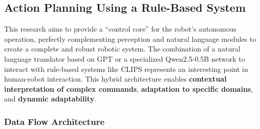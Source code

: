 \subsection{Action Planning Using a Rule-Based System}
\label{sub:clips}

 This research aims to provide a \enquote{control core} for the robot's autonomous operation, perfectly complementing perception and natural language modules to create a complete and robust robotic system. The combination of a natural language translator based on GPT or a specialized Qwen2.5-0.5B network to interact with rule-based systems like CLIPS represents an interesting point in human-robot interaction. This hybrid architecture enables \textbf{contextual interpretation of complex commands}, \textbf{adaptation to specific domains}, and \textbf{dynamic adaptability}.

\subsubsection{Data Flow Architecture}

